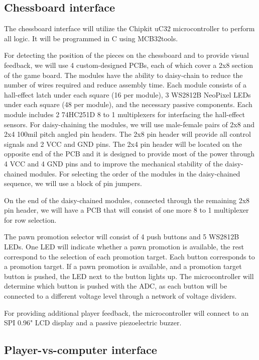 \documentclass{article}
\begin{document}
\subsection*{Chessboard interface}

The chessboard interface will utilize the Chipkit uC32 microcontroller to perform all logic. It will be programmed in C using MCB32tools.

For detecting the position of the pieces on the chessboard and to provide visual feedback, we will use 4 custom-designed PCBs, each of which cover a 2x8 section of the game board. The modules have the ability to daisy-chain to reduce the number of wires required and reduce assembly time. Each module consists of a hall-effect latch under each square (16 per module), 3 WS2812B NeoPixel LEDs under each square (48 per module), and the necessary passive components. Each module includes 2 74HC251D 8 to 1 multiplexers for interfacing the hall-effect sensors. For daisy-chaining the modules, we will use male-female pairs of 2x8 and 2x4 100mil pitch angled pin headers. The 2x8 pin header will provide all control signals and 2 VCC and GND pins. The 2x4 pin header will be located on the opposite end of the PCB and it is designed to provide most of the power through 4 VCC and 4 GND pins and to improve the mechanical stability of the daisy-chained modules. For selecting the order of the modules in the daisy-chained sequence, we will use a block of pin jumpers.

On the end of the daisy-chained modules, connected through the remaining 2x8 pin header, we will have a PCB that will consist of one more 8 to 1 multiplexer for row selection.

The pawn promotion selector will consist of 4 push buttons and 5 WS2812B LEDs. One LED will indicate whether a pawn promotion is available, the rest correspond to the selection of each promotion target. Each button corresponds to a promotion target. If a pawn promotion is available, and a promotion target button is pushed, the LED next to the button lights up. The microcontroller will determine which button is pushed with the ADC, as each button will be connected to a different voltage level through a network of voltage dividers.

For providing additional player feedback, the microcontroller will connect to an SPI 0.96" LCD display and a passive piezoelectric buzzer.

\subsection*{Player-vs-computer interface}
\end{document}
